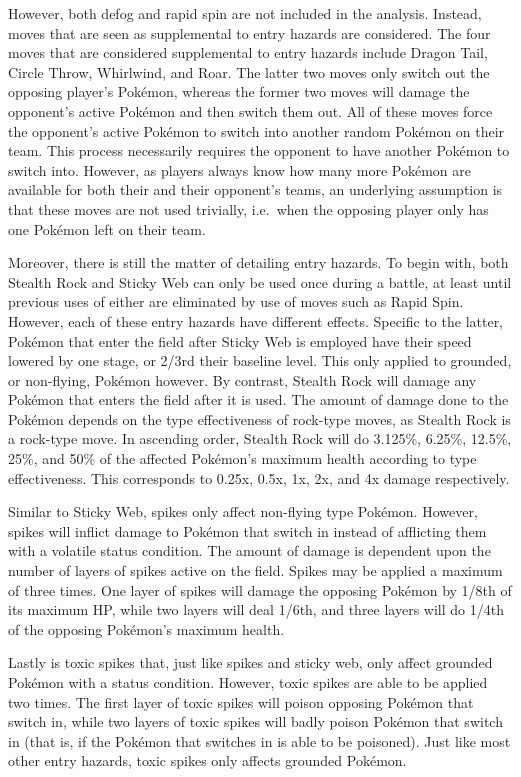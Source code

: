 \documentclass[12pt,twoside]{reedthesis}
\begin{document}
  However, both defog and rapid spin are not included in the analysis.
  Instead, moves that are seen as supplemental to entry hazards are
  considered. The four moves that are considered supplemental to entry
  hazards include Dragon Tail, Circle Throw, Whirlwind, and Roar. The
  latter two moves only switch out the opposing player's Pokémon, whereas
  the former two moves will damage the opponent's active Pokémon and then
  switch them out. All of these moves force the opponent's active Pokémon
  to switch into another random Pokémon on their team. This process
  necessarily requires the opponent to have another Pokémon to switch
  into. However, as players always know how many more Pokémon are
  available for both their and their opponent's teams, an underlying
  assumption is that these moves are not used trivially, i.e.~when the
  opposing player only has one Pokémon left on their team.
  
  Moreover, there is still the matter of detailing entry hazards. To begin
  with, both Stealth Rock and Sticky Web can only be used once during a
  battle, at least until previous uses of either are eliminated by use of
  moves such as Rapid Spin. However, each of these entry hazards have
  different effects. Specific to the latter, Pokémon that enter the field
  after Sticky Web is employed have their speed lowered by one stage, or
  2/3rd their baseline level. This only applied to grounded, or
  non-flying, Pokémon however. By contrast, Stealth Rock will damage any
  Pokémon that enters the field after it is used. The amount of damage
  done to the Pokémon depends on the type effectiveness of rock-type
  moves, as Stealth Rock is a rock-type move. In ascending order, Stealth
  Rock will do 3.125\%, 6.25\%, 12.5\%, 25\%, and 50\% of the affected
  Pokémon's maximum health according to type effectiveness. This
  corresponds to 0.25x, 0.5x, 1x, 2x, and 4x damage respectively.
  
  Similar to Sticky Web, spikes only affect non-flying type Pokémon.
  However, spikes will inflict damage to Pokémon that switch in instead of
  afflicting them with a volatile status condition. The amount of damage
  is dependent upon the number of layers of spikes active on the field.
  Spikes may be applied a maximum of three times. One layer of spikes will
  damage the opposing Pokémon by 1/8th of its maximum HP, while two layers
  will deal 1/6th, and three layers will do 1/4th of the opposing
  Pokémon's maximum health.
  
  Lastly is toxic spikes that, just like spikes and sticky web, only
  affect grounded Pokémon with a status condition. However, toxic spikes
  are able to be applied two times. The first layer of toxic spikes will
  poison opposing Pokémon that switch in, while two layers of toxic spikes
  will badly poison Pokémon that switch in (that is, if the Pokémon that
  switches in is able to be poisoned). Just like most other entry hazards,
  toxic spikes only affects grounded Pokémon.
  
\end{document}
